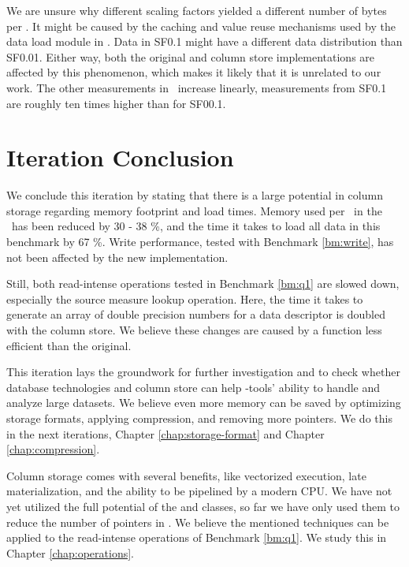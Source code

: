 We are unsure why different scaling factors yielded a different number of bytes per \lineitem. It might be caused by the caching and value reuse mechanisms used by the data load module in \gap. Data in SF0.1 might have a different data distribution than SF0.01. Either way, both the original and column store implementations are affected by this phenomenon, which makes it likely that it is unrelated to our work. The other measurements in \tpchdl~increase linearly, measurements from SF0.1 are roughly ten times higher than for SF00.1. 

\section{Iteration Conclusion}
\label{sec:Iteration Conclusion}
We conclude this iteration by stating that there is a large potential in column storage regarding memory footprint and load times. Memory used per \lineitem~in the \tpchdl~has been reduced by 30 - 38 \%, and the time it takes to load all data in this benchmark by 67 \%. Write performance, tested with Benchmark \ref{bm:write}, has not been affected by the new implementation.

Still, both read-intense operations tested in Benchmark \ref{bm:q1} are slowed down, especially the source measure lookup operation. Here, the time it takes to generate an array of double precision numbers for a data descriptor is doubled with the column store. We believe these changes are caused by a  function less efficient than the original.

This iteration lays the groundwork for further investigation and to check whether database technologies and column store can help \mdd-tools' ability to handle and analyze large datasets. We believe even more memory can be saved by optimizing storage formats, applying compression, and removing more pointers. We do this in the next iterations, Chapter \ref{chap:storage-format} and Chapter \ref{chap:compression}. 

Column storage comes with several benefits, like vectorized execution, late materialization, and the ability to be pipelined by a modern CPU. We have not yet utilized the full potential of the  and  classes, so far we have only used them to reduce the number of pointers in \gap. We believe the mentioned techniques can be applied to the read-intense operations of Benchmark \ref{bm:q1}. We study this in Chapter \ref{chap:operations}.

